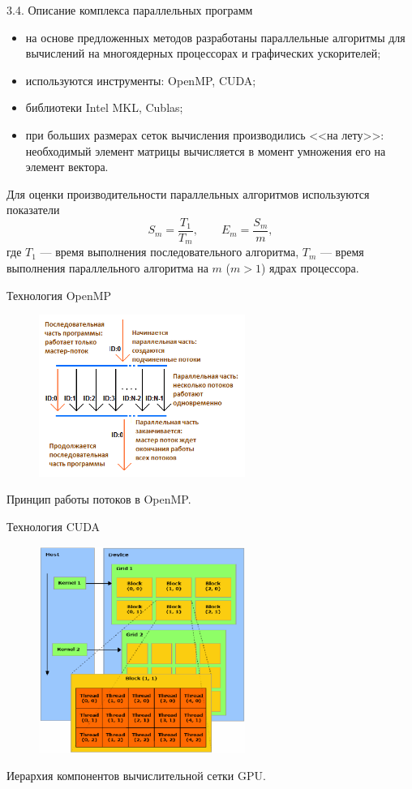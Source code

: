 \documentclass[10pt,pdf, mathserif, hyperref={unicode}]{beamer}
\begin{document}
\begin{frame}{3.4. Описание комплекса параллельных программ}
	\begin{itemize}
		\item на основе предложенных методов разработаны параллельные алгоритмы для вычислений на многоядерных процессорах и графических ускорителей;
		\item используются инструменты: OpenMP, CUDA;
		\item библиотеки Intel MKL, Cublas;
		\item при больших размерах сеток вычисления производились <<на лету>>: необходимый элемент матрицы вычисляется в момент умножения его на элемент вектора.
	\end{itemize}
	
	Для оценки производительности параллельных алгоритмов используются показатели {}
	$$
	S_m=\frac{T_1}{T_m},\quad
	\quad E_m=\frac{S_m}{m}, $$
	где $T_1$ --- время выполнения последовательного алгоритма,
	$T_m$ --- время выполнения параллельного алгоритма на $m$ ($m>1$) ядрах процессора.
\end{frame}
\begin{frame}{Технология OpenMP}
	\begin{figure}[h]
		\centering
		\includegraphics[width=0.6\textwidth]{omp}
	\end{figure}
	\centering
	Принцип работы потоков в OpenMP.
\end{frame}
\begin{frame}{Технология CUDA}
	\begin{figure}[h]
		\centering
		\includegraphics[width=0.6\textwidth]{cuda}
	\end{figure}
	\centering
	Иерархия компонентов вычислительной сетки GPU.
\end{frame}
\end{document}

